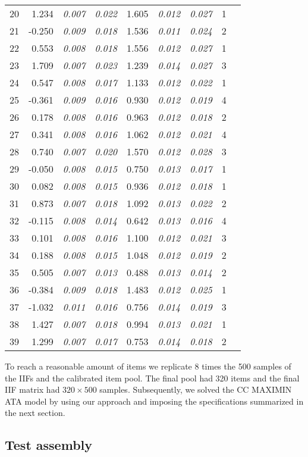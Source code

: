 \begin{table}[H]
\begin{tabular}{l r >{\em}c >{\em}c r >{\em}c >{\em}c cc}
		20&1.234 & 0.007 & 0.022 & 1.605 & 0.012 & 0.027 & 1 & \\
		21&-0.250 & 0.009 & 0.018 & 1.536 & 0.011 & 0.024 & 2 & \\
		22&0.553 & 0.008 & 0.018 & 1.556 & 0.012 & 0.027 & 1 & \\
		23&1.709 & 0.007 & 0.023 & 1.239 & 0.014 & 0.027 & 3 & \\
		24&0.547 & 0.008 & 0.017 & 1.133 & 0.012 & 0.022 & 1 & \\
		25&-0.361 & 0.009 & 0.016 & 0.930 & 0.012 & 0.019 & 4 & \\
		26&0.178 & 0.008 & 0.016 & 0.963 & 0.012 & 0.018 & 2 & \\
		27&0.341 & 0.008 & 0.016 & 1.062 & 0.012 & 0.021 & 4 & \\
		28&0.740 & 0.007 & 0.020 & 1.570 & 0.012 & 0.028 & 3 & \\
		29&-0.050 & 0.008 & 0.015 & 0.750 & 0.013 & 0.017 & 1 & \\
		30&0.082 & 0.008 & 0.015 & 0.936 & 0.012 & 0.018 & 1 & \\
		31&0.873 & 0.007 & 0.018 & 1.092 & 0.013 & 0.022 & 2 & \\
		32&-0.115 & 0.008 & 0.014 & 0.642 & 0.013 & 0.016 & 4 & \\
		33&0.101 & 0.008 & 0.016 & 1.100 & 0.012 & 0.021 & 3 & \\
		34&0.188 & 0.008 & 0.015 & 1.048 & 0.012 & 0.019 & 2 & \\
		35&0.505 & 0.007 & 0.013 & 0.488 & 0.013 & 0.014 & 2 & \\
		36&-0.384 & 0.009 & 0.018 & 1.483 & 0.012 & 0.025 & 1 & \\
		37&-1.032 & 0.011 & 0.016 & 0.756 & 0.014 & 0.019 & 3 & \\
		38&1.427 & 0.007 & 0.018 & 0.994 & 0.013 & 0.021 & 1 & \\
		39&1.299 & 0.007 & 0.017 & 0.753 & 0.014 & 0.018 & 2 & \\		
		\bottomrule
	\end{tabular}
\end{table}

To reach a reasonable amount of items we replicate 8 times the 500 samples of the IIFs and the calibrated item pool. The final pool had 320 items and the final IIF matrix had $320 \times 500 $ samples. Subsequently, we solved the CC MAXIMIN ATA model by using our approach and imposing the specifications summarized in the next section.

\subsection{Test assembly}

